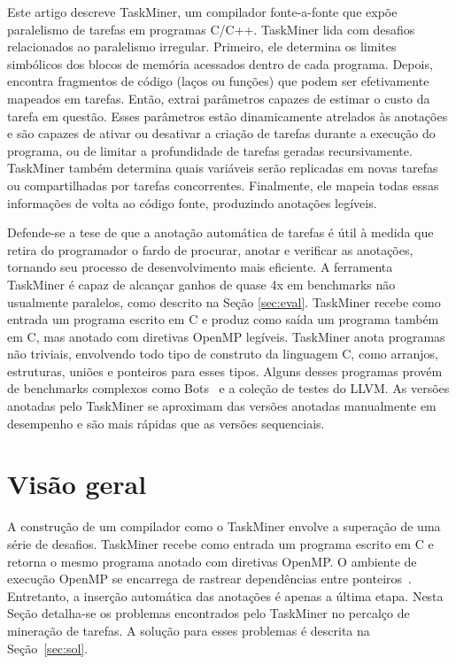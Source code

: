 \documentclass[sigplan,10pt]{acmart}
\newcommand\Taskminer{\mbox{\textsf{TaskMiner}}}
\begin{document}
Este artigo descreve {\Taskminer}, um compilador fonte-a-fonte que expõe
paralelismo de tarefas em programas C/C++. {\Taskminer} lida com desafios 
relacionados ao paralelismo irregular. Primeiro, ele determina os limites
simbólicos dos blocos de memória acessados dentro de cada programa. Depois, encontra 
fragmentos de código (laços ou funções) que podem 
ser efetivamente mapeados em tarefas. Então, extrai parâmetros capazes
de estimar o custo da tarefa em questão. Esses parâmetros estão dinamicamente atrelados
às anotações e são capazes de ativar ou desativar a criação de tarefas durante a execução do programa,
ou de limitar a profundidade de tarefas geradas recursivamente. \Taskminer{} também determina
quais variáveis serão replicadas em novas tarefas ou compartilhadas por tarefas concorrentes.
Finalmente, ele mapeia todas essas informações de volta ao código fonte, produzindo
anotações legíveis.

Defende-se a tese de que a anotação automática de tarefas é útil à medida que
retira do programador o fardo de procurar, anotar e verificar as anotações, tornando seu
processo de desenvolvimento mais eficiente. A ferramenta {\Taskminer} é capaz
de alcançar ganhos de quase 4x em benchmarks não usualmente paralelos, como descrito na Seção \ref{sec:eval}. {\Taskminer}
recebe como entrada um programa escrito em C e produz como saída um programa também em C,
mas anotado com diretivas OpenMP legíveis. {\Taskminer} anota programas não triviais, envolvendo
todo tipo de construto da linguagem C, como arranjos, estruturas, uniões e ponteiros para esses tipos.
Alguns desses programas provém de benchmarks complexos como Bots~\cite{Duran09}  e a coleção de testes do LLVM.
As versões anotadas pelo {\Taskminer} se aproximam das versões anotadas manualmente em
desempenho e são mais rápidas que as versões sequenciais.


\section{Visão geral}
\label{sec:ovf}

A construção de um compilador como o \Taskminer{} envolve a superação de uma série  de desafios.
\Taskminer{} recebe como entrada um programa escrito em C e retorna o mesmo programa anotado com 
diretivas OpenMP. O ambiente de execução OpenMP se encarrega de 
rastrear dependências entre ponteiros~\cite{LaGrone11}. Entretanto, a inserção
automática das anotações é apenas a última etapa. Nesta Seção detalha-se os problemas
encontrados pelo \Taskminer{} no percalço de mineração de tarefas. A solução para esses problemas é descrita na Seção~\ref{sec:sol}.
\end{document}
